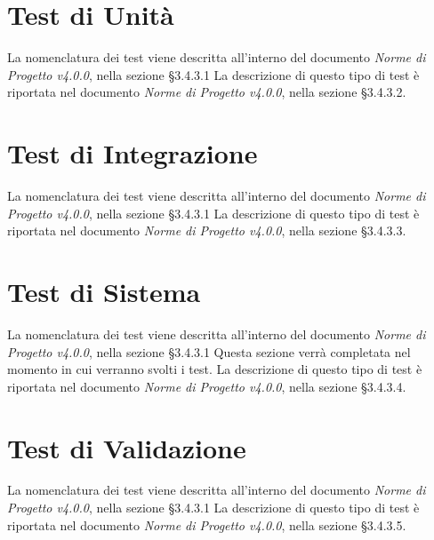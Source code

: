 \section{Test di Unità}
\label{test_u}

La nomenclatura dei test viene descritta all'interno del documento \textit{Norme di Progetto v4.0.0}, nella sezione §3.4.3.1 La descrizione di questo tipo di test è riportata nel documento \textit{Norme di Progetto v4.0.0}, nella sezione §3.4.3.2.




\newpage
\section{Test di Integrazione}
\label{test_i}
La nomenclatura dei test viene descritta all'interno del documento \textit{Norme di Progetto v4.0.0}, nella sezione §3.4.3.1 La descrizione di questo tipo di test è riportata nel documento \textit{Norme di Progetto v4.0.0}, nella sezione §3.4.3.3.



\newpage
\section{Test di Sistema}
\label{test_s}
La nomenclatura dei test viene descritta all'interno del documento \textit{Norme di Progetto v4.0.0}, nella sezione §3.4.3.1 Questa sezione verrà completata nel momento in cui verranno svolti i test. La descrizione di questo tipo di test è riportata nel documento \textit{Norme di Progetto v4.0.0}, nella sezione §3.4.3.4.




\newpage





\section{Test di Validazione}
\label{test_v}

La nomenclatura dei test viene descritta all'interno del documento \textit{Norme di Progetto v4.0.0}, nella sezione §3.4.3.1 La descrizione di questo tipo di test è riportata nel documento \textit{Norme di Progetto v4.0.0}, nella sezione §3.4.3.5.




